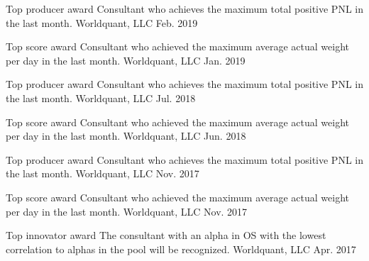 



\begin{cvhonors}

  \cvhonor
    {Top producer award} %
    {Consultant who achieves the maximum total positive PNL in the last month.} %
    {Worldquant, LLC} %
    {Feb. 2019} %

  \cvhonor
    {Top score award} %
    {Consultant who achieved the maximum average actual weight per day in the last month.} %
    {Worldquant, LLC} %
    {Jan. 2019} %

  \cvhonor
    {Top producer award} %
    {Consultant who achieves the maximum total positive PNL in the last month.} %
    {Worldquant, LLC} %
    {Jul. 2018} %

  \cvhonor
    {Top score award} %
    {Consultant who achieved the maximum average actual weight per day in the last month.} %
    {Worldquant, LLC} %
    {Jun. 2018} %

  \cvhonor
    {Top producer award} %
    {Consultant who achieves the maximum total positive PNL in the last month.} %
    {Worldquant, LLC} %
    {Nov. 2017} %

  \cvhonor
    {Top score award} %
    {Consultant who achieved the maximum average actual weight per day in the last month.} %
    {Worldquant, LLC} %
    {Nov. 2017} %

  \cvhonor
    {Top innovator award} %
    {The consultant with an alpha in OS with the lowest correlation to alphas in the pool will be recognized.} %
    {Worldquant, LLC} %
    {Apr. 2017} %


\end{cvhonors}
